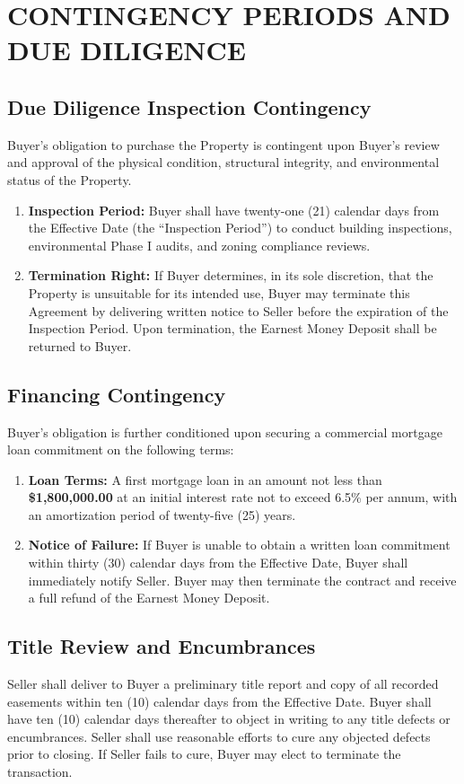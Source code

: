 \section{CONTINGENCY PERIODS AND DUE DILIGENCE}

\subsection{Due Diligence Inspection Contingency}
Buyer's obligation to purchase the Property is contingent upon Buyer's review and approval of the physical condition, structural integrity, and environmental status of the Property.
\begin{enumerate}
    \item \textbf{Inspection Period:} Buyer shall have twenty-one (21) calendar days from the Effective Date (the ``Inspection Period'') to conduct building inspections, environmental Phase I audits, and zoning compliance reviews.
    \item \textbf{Termination Right:} If Buyer determines, in its sole discretion, that the Property is unsuitable for its intended use, Buyer may terminate this Agreement by delivering written notice to Seller before the expiration of the Inspection Period. Upon termination, the Earnest Money Deposit shall be returned to Buyer.
\end{enumerate}

\subsection{Financing Contingency}
Buyer's obligation is further conditioned upon securing a commercial mortgage loan commitment on the following terms:
\begin{enumerate}
    \item \textbf{Loan Terms:} A first mortgage loan in an amount not less than \textbf{\$1,800,000.00} at an initial interest rate not to exceed 6.5\% per annum, with an amortization period of twenty-five (25) years.
    \item \textbf{Notice of Failure:} If Buyer is unable to obtain a written loan commitment within thirty (30) calendar days from the Effective Date, Buyer shall immediately notify Seller. Buyer may then terminate the contract and receive a full refund of the Earnest Money Deposit.
\end{enumerate}

\subsection{Title Review and Encumbrances}
Seller shall deliver to Buyer a preliminary title report and copy of all recorded easements within ten (10) calendar days from the Effective Date. Buyer shall have ten (10) calendar days thereafter to object in writing to any title defects or encumbrances. Seller shall use reasonable efforts to cure any objected defects prior to closing. If Seller fails to cure, Buyer may elect to terminate the transaction.
